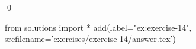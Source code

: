 
\begin{ex} 
  \label{ex:exercise-14}
  
  \qed
\end{ex} 
\begin{python0}
from solutions import *
add(label="ex:exercise-14",
    srcfilename='exercises/exercise-14/answer.tex') 
\end{python0}
